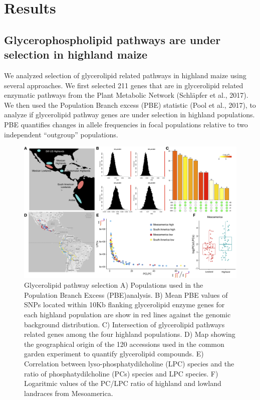 \documentclass[9pt,twocolumn,twoside,lineno]{gsajnl}
\begin{document}
\section{Results}
\label{sec:results}

\subsection{Glycerophospholipid pathways are under selection in  highland maize} 
We analyzed selection of glycerolipid related pathways in highland maize using several approaches. 
We first selected 211 genes that are in glycerolipid related enzymatic pathways from the Plant Metabolic Network (Schläpfer et al., 2017). 
We then used the Population Branch excess (PBE) statistic (Pool et al., 2017), to analyze if glycerolipid pathway genes are under selection in highland populations. 
PBE quantifies changes in allele frequencies in focal populations relative to two independent “outgroup” populations. 

\begin{figure}[!ht]
\begin{center}
\includegraphics[width=0.8\paperwidth]{Figures/Fig_1.png}
\caption{Glycerolipid pathway selection 
A) Populations used in the Population Branch Excess (PBE)analysis. 
B) Mean PBE values of SNPs located within 10Kb flanking glycerolipid enzyme genes for each highland population are show in red lines against the genomic background distribution. 
C) Intersection of glycerolipid pathways related genes among the four highland populations. 
D) Map showing the geographical origin of the 120 accessions used in the common garden experiment to quantify glycerolipid compounds. 
E) Correlation between  lyso-phosphatydilcholine (LPC) species and the ratio of  phosphatydilcholine (PCs) species and LPC species. 
F) Logaritmic values of the PC/LPC ratio of highland and lowland landraces from Mesoamerica.}
\label{PBE_Qst-Fst}
\end{center}
\end{figure} 
\end{document}
